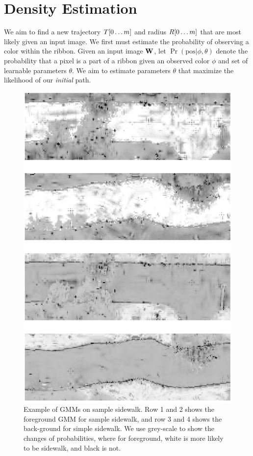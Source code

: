 
\section{Density Estimation}
We aim to find a new trajectory $T{[0\dots m]}$ and radius $R{[0\dots m]}$ that are most likely given an input image. We first must estimate the probability of observing a color within the ribbon.  
Given an input image $\mathbf{W}{}$, let $\Pr(\text{pos}|\phi,\theta)$ denote the probability that a pixel is a part of a ribbon given an observed color $\phi$ and set of learnable parameters $\theta$. 
We aim to estimate parameters $\theta$ that maximize the likelihood of our \textit{initial} path. 

\begin{figure}[H]
    \centering
    \includegraphics[width=0.75\columnwidth]{Figures/GMM_sample6.png}
    \caption[\ac{GMM} Result 2]{Example of GMMs on sample sidewalk. Row 1 and 2 shows the foreground GMM for sample sidewalk, and row 3 and 4 shows the back-ground for simple sidewalk. We use grey-scale to show the changes of probabilities, where for foreground, white is more likely to be sidewalk, and black is not.}
    \label{fig:GMM_result_2}
\end{figure}

